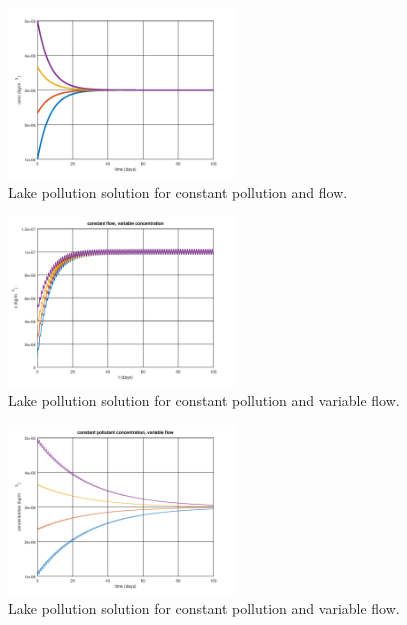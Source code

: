 \documentclass[a4paper]{article}
\begin{document}
\begin{soln}
\begin{multicols}{2}
\begin{figure}[H]
    \centering
    \includegraphics[height=4.5cm]{img/lake/c_const_f_const.png}
    \caption{Lake pollution solution for constant pollution and flow.}
    \label{fig:my_label}
\end{figure}

\columnbreak
\begin{figure}[H]
    \centering
    \includegraphics[height=4.5cm]{img/lake/c_var_f_const.png}
    \caption{Lake pollution solution for constant pollution and variable flow.}
    \label{fig:my_label}
\end{figure}
\end{multicols}

\begin{multicols}{2}
\begin{figure}[H]
    \centering
    \includegraphics[height=4.5cm]{img/lake/c_const_f_var.png}
    \caption{Lake pollution solution for constant pollution and variable flow.}
    \label{fig:my_label}
\end{figure}


\end{multicols}
\end{soln}
\end{document}
